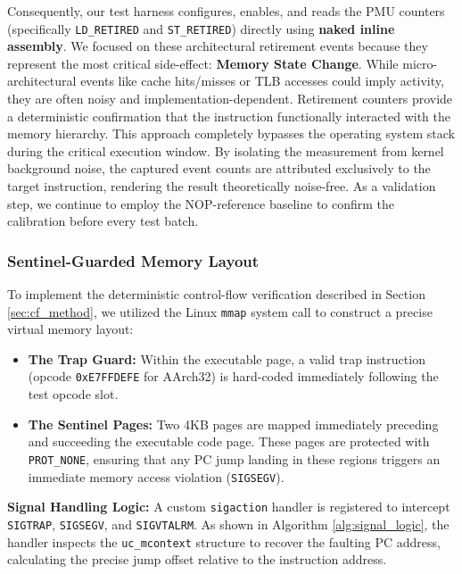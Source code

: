 \documentclass[pdflatex,sn-mathphys]{sn-jnl}%
\theoremstyle{thmstyleone}%
\theoremstyle{thmstyletwo}%
\theoremstyle{thmstylethree}%
\begin{document}
Consequently, our test harness configures, enables, and reads the PMU counters (specifically \texttt{LD\_RETIRED} and \texttt{ST\_RETIRED}) directly using \textbf{naked inline assembly}. We focused on these architectural retirement events because they represent the most critical side-effect: \textbf{Memory State Change}. While micro-architectural events like cache hits/misses or TLB accesses could imply activity, they are often noisy and implementation-dependent. Retirement counters provide a deterministic confirmation that the instruction functionally interacted with the memory hierarchy. This approach completely bypasses the operating system stack during the critical execution window. By isolating the measurement from kernel background noise, the captured event counts are attributed exclusively to the target instruction, rendering the result theoretically noise-free. As a validation step, we continue to employ the NOP-reference baseline to confirm the calibration before every test batch.

\subsubsection{Sentinel-Guarded Memory Layout}
To implement the deterministic control-flow verification described in Section \ref{sec:cf_method}, we utilized the Linux \texttt{mmap} system call to construct a precise virtual memory layout:
\begin{itemize}
    \item \textbf{The Trap Guard:} Within the executable page, a valid trap instruction (opcode \texttt{0xE7FFDEFE} for AArch32) is hard-coded immediately following the test opcode slot.
    \item \textbf{The Sentinel Pages:} Two 4KB pages are mapped immediately preceding and succeeding the executable code page. These pages are protected with \texttt{PROT\_NONE}, ensuring that any PC jump landing in these regions triggers an immediate memory access violation (\texttt{SIGSEGV}).
\end{itemize}

\textbf{Signal Handling Logic:} A custom \texttt{sigaction} handler is registered to intercept \texttt{SIGTRAP}, \texttt{SIGSEGV}, and \texttt{SIGVTALRM}. As shown in Algorithm \ref{alg:signal_logic}, the handler inspects the \texttt{uc\_mcontext} structure to recover the faulting PC address, calculating the precise jump offset relative to the instruction address.
\end{document}
